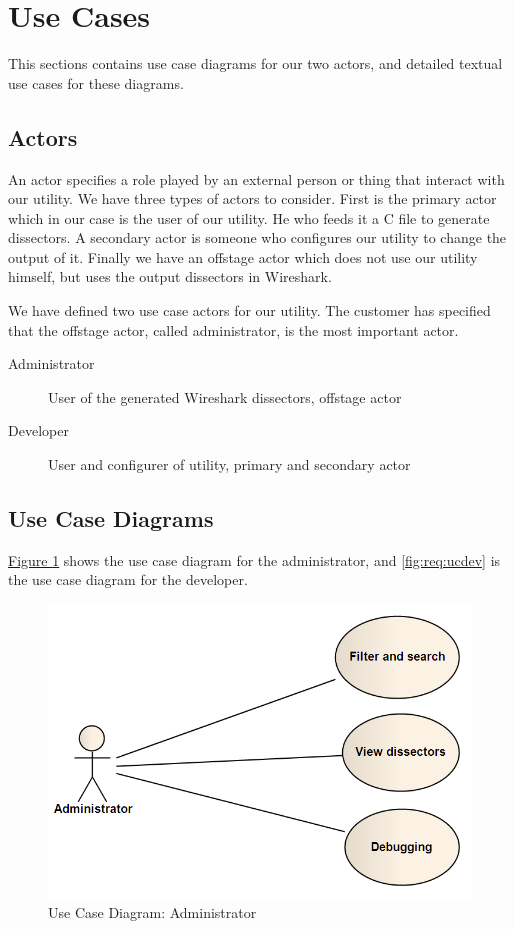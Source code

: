 \section{Use Cases}
\label{sec:req:usecases}
This sections contains use case diagrams for our two actors, and detailed
textual use cases for these diagrams.

\subsection{Actors}
An actor specifies a role played by an external person or thing that interact
with our utility. We have three types of actors to consider. First is the
primary actor which in our case is the user of our utility. He who feeds it a
C file to generate dissectors. A secondary actor is someone who configures our
utility to change the output of it. Finally we have an offstage actor which
does not use our utility himself, but uses the output dissectors in Wireshark.

We have defined two use case actors for our utility. The customer has specified
that the offstage actor, called administrator, is the most important actor.
\begin{description}
	\item[Administrator] User of the generated Wireshark dissectors, offstage actor
	\item[Developer] User and configurer of utility, primary and secondary actor
\end{description}

\subsection{Use Case Diagrams}
\hyperref[fig:req:ucadm]{Figure \ref*{fig:req:ucadm}} shows the use case
diagram for the administrator, and \autoref{fig:req:ucdev} is the use case
diagram for the developer.
\begin{figure}[htbp]
	\center
	\includegraphics[width=\textwidth]{./planning/img/administrator.png}
	\caption{Use Case Diagram: Administrator\label{fig:req:ucadm}}
\end{figure}

